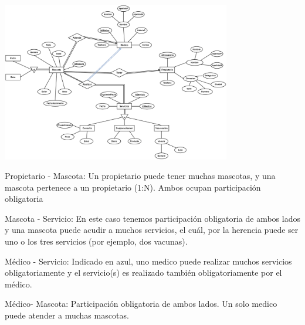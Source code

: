 \begin{center}
    \includegraphics[width=10cm]{resources/Clinica-Veterinaria.png}
\end{center}

Propietario - Mascota: Un propietario puede tener muchas mascotas, y una mascota pertenece a un propietario (1:N). Ambos ocupan participación obligatoria

Mascota - Servicio: En este caso tenemos participación obligatoria de ambos lados y una mascota puede acudir a muchos servicios, el cuál, por la herencia puede ser uno o los tres servicios (por ejemplo, dos vacunas). 

Médico - Servicio: Indicado en azul, uno medico puede realizar muchos servicios obligatoriamente y el servicio(s) es realizado también obligatoriamente por el médico.

Médico- Mascota: Participación obligatoria de ambos lados. Un solo medico puede atender a muchas mascotas.

